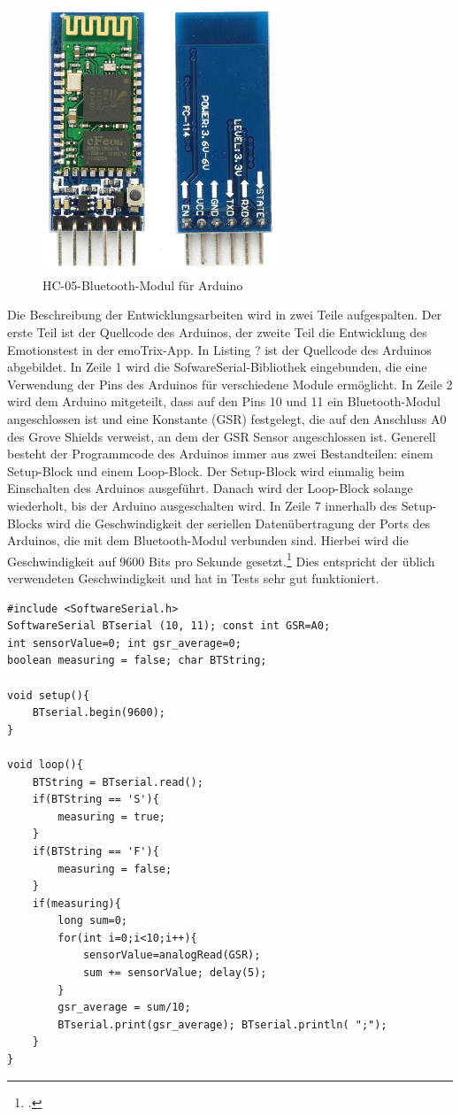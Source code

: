 \begin{figure}[h]
	\centering
	\includegraphics[width=7cm]{Bilder/hc05.jpg}
	\caption[HC-05-Bluetooth-Modul für Arduino]{HC-05-Bluetooth-Modul für Arduino\footnotemark}
\end{figure}%
\newline
Die Beschreibung der Entwicklungsarbeiten wird in zwei Teile aufgespalten. Der erste Teil ist der Quellcode des Arduinos, der zweite Teil die Entwicklung des Emotionstest in der emoTrix-App. \newline
In Listing ? ist der Quellcode des Arduinos abgebildet. In Zeile 1 wird die SofwareSerial-Bibliothek eingebunden, die eine Verwendung der Pins des Arduinos für verschiedene Module ermöglicht. In Zeile 2 wird dem Arduino mitgeteilt, dass auf den Pins 10 und 11 ein Bluetooth-Modul angeschlossen ist und eine Konstante (GSR) festgelegt, die auf den Anschluss A0 des Grove Shields verweist, an dem der GSR Sensor angeschlossen ist. \newline
Generell besteht der Programmcode des Arduinos immer aus zwei Bestandteilen: einem Setup-Block und einem Loop-Block. Der Setup-Block wird einmalig beim Einschalten des Arduinos ausgeführt. Danach wird der Loop-Block solange wiederholt, bis der Arduino ausgeschalten wird. \newline
In Zeile 7 innerhalb des Setup-Blocks wird die Geschwindigkeit der seriellen Datenübertragung der Ports des Arduinos, die mit dem Bluetooth-Modul verbunden sind. Hierbei wird die Geschwindigkeit auf 9600 Bits pro Sekunde gesetzt.\footcite[Vgl.][]{Ard18b} Dies entspricht der üblich verwendeten Geschwindigkeit und hat in Tests sehr gut funktioniert. \newline
\begin{lstlisting}[caption={Quellcode des Arduinos},style=Arduino]
#include <SoftwareSerial.h>
SoftwareSerial BTserial (10, 11); const int GSR=A0;
int sensorValue=0; int gsr_average=0;
boolean measuring = false; char BTString;

void setup(){
	BTserial.begin(9600);
}

void loop(){
	BTString = BTserial.read();
	if(BTString == 'S'){
		measuring = true;
	}
	if(BTString == 'F'){
		measuring = false;
	}
	if(measuring){
		long sum=0;
		for(int i=0;i<10;i++){ 
			sensorValue=analogRead(GSR);
			sum += sensorValue; delay(5);
		}
		gsr_average = sum/10;
		BTserial.print(gsr_average); BTserial.println( ";");
	}
}
\end{lstlisting}
